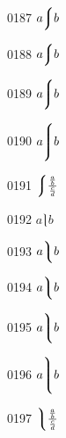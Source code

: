 \documentclass{article}
\begin{document}
0187 $a\big\lmoustache b$\par
0188 $a\Big\lmoustache b$\par
0189 $a\bigg\lmoustache b$\par
0190 $a\Bigg\lmoustache b$\par
0191 $\left\lmoustache \frac{\frac{a}{b}}{\frac{c}{d}}\right.$\par
0192 $a\rmoustache b$\par
0193 $a\big\rmoustache b$\par
0194 $a\Big\rmoustache b$\par
0195 $a\bigg\rmoustache b$\par
0196 $a\Bigg\rmoustache b$\par
0197 $\left\rmoustache \frac{\frac{a}{b}}{\frac{c}{d}}\right.$\par
\end{document}
